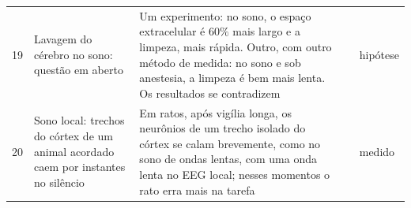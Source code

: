 {\begin{longtable}{>{\raggedright}p{0.5cm}>{\raggedright}p{4.0cm}>{\raggedright}p{5.6cm}>{\raggedright}p{2.3cm}>{\raggedright\arraybackslash}p{1.7cm}}
19 & Lavagem do cérebro no sono: questão em aberto & Um experimento: no sono, o espaço extracelular é $60\%$ mais largo e a limpeza, mais rápida. Outro, com outro método de medida: no sono e sob anestesia, a limpeza é bem mais lenta. Os resultados se contradizem & \cite{Xie2013,Miao2024} & hipótese \\
20 & Sono local: trechos do córtex de um animal acordado caem por instantes no silêncio & Em ratos, após vigília longa, os neurônios de um trecho isolado do córtex se calam brevemente, como no sono de ondas lentas, com uma onda lenta no EEG local; nesses momentos o rato erra mais na tarefa & \cite{Vyazovskiy2011} & medido \\
\bottomrule
\end{longtable}}
